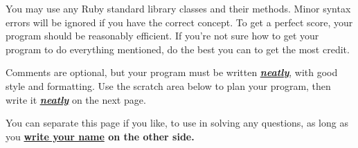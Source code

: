 \documentclass[11pt]{article}
\begin{document}
\begin{enumerate}
          \vspace{-2.5mm}

          You may use any Ruby standard library classes and their methods.
          Minor syntax errors will be ignored if you have the correct
          concept.  To get a perfect score, your program should be
          reasonably efficient.  If you're not sure how to get your program
          to do everything mentioned, do the best you can to get the most
          credit.

          Comments are optional, but your program must be written
          \textbf{\underline{\underline{\emph{\large neatly}}}}, with good
          style and formatting.  Use the scratch area below to plan your
          program, then write it \textbf{\underline{\underline{\emph{\large
          neatly}}}} on the next page.

          \vspace{-1mm}

          \underline{\hspace{6.8225in}}

          \medskip

          \begin{centering}

            \scratchpaper[\linewidth]

          \end{centering}

          \pagebreak

          \vspace*{0mm}

          \enlargethispage{8mm}



          \pagebreak


  \end{enumerate}


  \markright{}

  \begin{center}

    \scratchpaper

    \bigskip

    \Large

    You can separate this page if you like, to use in solving any
    \linebreak
    questions, as long as you \textbf{\underline{write your name} on the
    other side.}

  \end{center}

\end{document}
